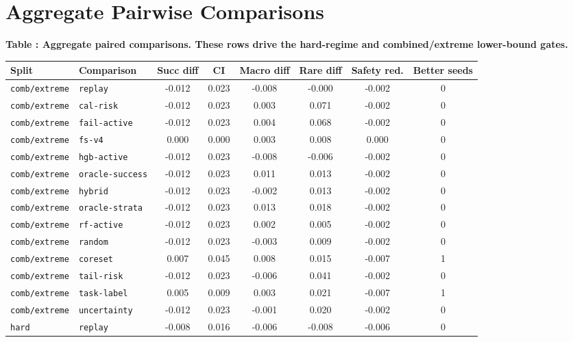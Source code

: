 \documentclass{article}
\begin{document}
\section{Aggregate Pairwise Comparisons}
\tiny
\setlength{\tabcolsep}{2pt}
\begin{center}
\label{tab:aggpair}\textbf{Table \thetable: Aggregate paired comparisons. These rows drive the hard-regime and combined/extreme lower-bound gates.}\\[0.4ex]
\begin{tabular}{llcccccc}
\toprule
Split & Comparison & Succ diff & CI & Macro diff & Rare diff & Safety red. & Better seeds \\
\midrule
\texttt{comb/extreme} & \texttt{replay} & -0.012 & 0.023 & -0.008 & -0.000 & -0.002 & 0 \\
\texttt{comb/extreme} & \texttt{cal-risk} & -0.012 & 0.023 & 0.003 & 0.071 & -0.002 & 0 \\
\texttt{comb/extreme} & \texttt{fail-active} & -0.012 & 0.023 & 0.004 & 0.068 & -0.002 & 0 \\
\texttt{comb/extreme} & \texttt{fs-v4} & 0.000 & 0.000 & 0.003 & 0.008 & 0.000 & 0 \\
\texttt{comb/extreme} & \texttt{hgb-active} & -0.012 & 0.023 & -0.008 & -0.006 & -0.002 & 0 \\
\texttt{comb/extreme} & \texttt{oracle-success} & -0.012 & 0.023 & 0.011 & 0.013 & -0.002 & 0 \\
\texttt{comb/extreme} & \texttt{hybrid} & -0.012 & 0.023 & -0.002 & 0.013 & -0.002 & 0 \\
\texttt{comb/extreme} & \texttt{oracle-strata} & -0.012 & 0.023 & 0.013 & 0.018 & -0.002 & 0 \\
\texttt{comb/extreme} & \texttt{rf-active} & -0.012 & 0.023 & 0.002 & 0.005 & -0.002 & 0 \\
\texttt{comb/extreme} & \texttt{random} & -0.012 & 0.023 & -0.003 & 0.009 & -0.002 & 0 \\
\texttt{comb/extreme} & \texttt{coreset} & 0.007 & 0.045 & 0.008 & 0.015 & -0.007 & 1 \\
\texttt{comb/extreme} & \texttt{tail-risk} & -0.012 & 0.023 & -0.006 & 0.041 & -0.002 & 0 \\
\texttt{comb/extreme} & \texttt{task-label} & 0.005 & 0.009 & 0.003 & 0.021 & -0.007 & 1 \\
\texttt{comb/extreme} & \texttt{uncertainty} & -0.012 & 0.023 & -0.001 & 0.020 & -0.002 & 0 \\
\texttt{hard} & \texttt{replay} & -0.008 & 0.016 & -0.006 & -0.008 & -0.006 & 0 \\

\end{tabular}
\end{center}
\end{document}
